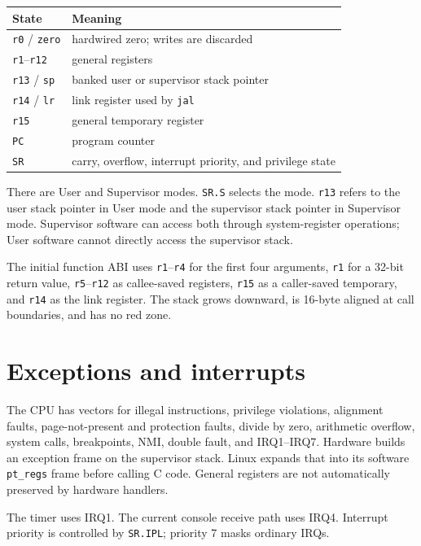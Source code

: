 \documentclass[
  oneside,
  openany]{book}
\begin{document}
\begin{longtable}[]{@{}ll@{}}
\toprule\noalign{}
State & Meaning \\
\midrule\noalign{}
\endhead
\bottomrule\noalign{}
\endlastfoot
\texttt{r0} / \texttt{zero} & hardwired zero; writes are discarded \\
\texttt{r1}--\texttt{r12} & general registers \\
\texttt{r13} / \texttt{sp} & banked user or supervisor stack pointer \\
\texttt{r14} / \texttt{lr} & link register used by \texttt{jal} \\
\texttt{r15} & general temporary register \\
\texttt{PC} & program counter \\
\texttt{SR} & carry, overflow, interrupt priority, and privilege
state \\
\end{longtable}

There are User and Supervisor modes. \texttt{SR.S} selects the mode.
\texttt{r13} refers to the user stack pointer in User mode and the
supervisor stack pointer in Supervisor mode. Supervisor software can
access both through system-register operations; User software cannot
directly access the supervisor stack.

The initial function ABI uses \texttt{r1}--\texttt{r4} for the first
four arguments, \texttt{r1} for a 32-bit return value,
\texttt{r5}--\texttt{r12} as callee-saved registers, \texttt{r15} as a
caller-saved temporary, and \texttt{r14} as the link register. The stack
grows downward, is 16-byte aligned at call boundaries, and has no red
zone.

\hypertarget{exceptions-and-interrupts}{%
\section{Exceptions and interrupts}\label{exceptions-and-interrupts}}

The CPU has vectors for illegal instructions, privilege violations,
alignment faults, page-not-present and protection faults, divide by
zero, arithmetic overflow, system calls, breakpoints, NMI, double fault,
and IRQ1--IRQ7. Hardware builds an exception frame on the supervisor
stack. Linux expands that into its software \texttt{pt\_regs} frame
before calling C code. General registers are not automatically preserved
by hardware handlers.

The timer uses IRQ1. The current console receive path uses IRQ4.
Interrupt priority is controlled by \texttt{SR.IPL}; priority 7 masks
ordinary IRQs.
\end{document}
